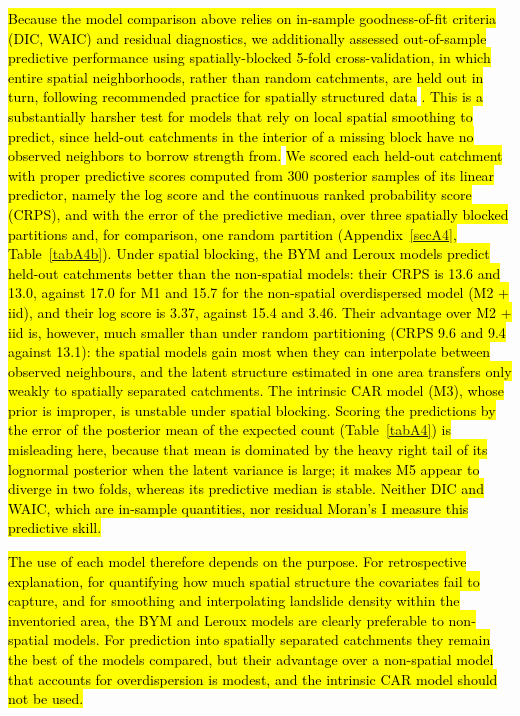 \documentclass[journal abbreviation, manuscript]{copernicus}
\newcommand{\hlG}[1]{{\sethlcolor{green}\hl{#1}}}
\newcommand{\hlE}[1]{{\sethlcolor{edcyan}\hl{#1}}}
\begin{document}
\hlG{Because the model comparison above relies on in-sample goodness-of-fit criteria (DIC, WAIC) and residual diagnostics, we additionally assessed out-of-sample predictive performance using spatially-blocked 5-fold cross-validation, in which entire spatial neighborhoods, rather than random catchments, are held out in turn, following recommended practice for spatially structured data }\citep{brenning2005spatial}
\hlE{. This is a substantially harsher test for models that rely on local spatial smoothing to predict, since held-out catchments in the interior of a missing block have no observed neighbors to borrow strength from. }
\hlE{We scored each held-out catchment with proper predictive scores computed from 300 posterior samples of its linear predictor, namely the log score and the continuous ranked probability score (CRPS), and with the error of the predictive median, over three spatially blocked partitions and, for comparison, one random partition (\mbox{Appendix~\ref{secA4}}, \mbox{Table~\ref{tabA4b}}). Under spatial blocking, the BYM and Leroux models predict held-out catchments better than the non-spatial models: their CRPS is 13.6 and 13.0, against 17.0 for M1 and 15.7 for the non-spatial overdispersed model (M2 + iid), and their log score is 3.37, against 15.4 and 3.46. Their advantage over M2 + iid is, however, much smaller than under random partitioning (CRPS 9.6 and 9.4 against 13.1): the spatial models gain most when they can interpolate between observed neighbours, and the latent structure estimated in one area transfers only weakly to spatially separated catchments. The intrinsic CAR model (M3), whose prior is improper, is unstable under spatial blocking. Scoring the predictions by the error of the posterior mean of the expected count (\mbox{Table~\ref{tabA4}}) is misleading here, because that mean is dominated by the heavy right tail of its lognormal posterior when the latent variance is large; it makes M5 appear to diverge in two folds, whereas its predictive median is stable. Neither DIC and WAIC, which are in-sample quantities, nor residual Moran's I measure this predictive skill.}

\hlE{The use of each model therefore depends on the purpose. For retrospective explanation, for quantifying how much spatial structure the covariates fail to capture, and for smoothing and interpolating landslide density within the inventoried area, the BYM and Leroux models are clearly preferable to non-spatial models. For prediction into spatially separated catchments they remain the best of the models compared, but their advantage over a non-spatial model that accounts for overdispersion is modest, and the intrinsic CAR model should not be used.}
\end{document}
